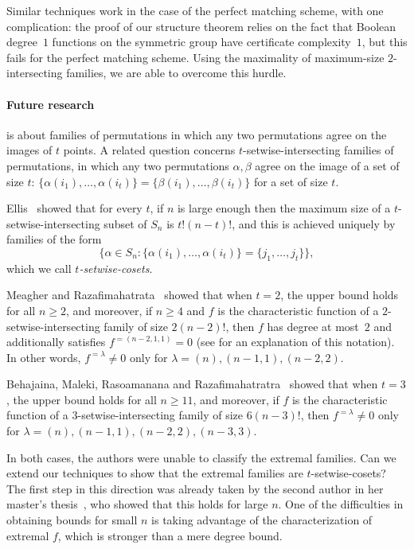 \documentclass{article}
\theoremstyle{definition}
\begin{document}
Similar techniques work in the case of the perfect matching scheme, with one complication: the proof of our structure theorem relies on the fact that Boolean degree~$1$ functions on the symmetric group have certificate complexity~$1$, but this fails for the perfect matching scheme. Using the maximality of maximum-size $2$-intersecting families, we are able to overcome this hurdle.

\paragraph{Future research}  is about families of permutations in which any two permutations agree on the images of $t$ points. A related question concerns $t$-setwise-intersecting families of permutations, in which any two permutations $\alpha,\beta$ agree on the image of a set of size $t$: $\{\alpha(i_1),\ldots,\alpha(i_t)\} = \{\beta(i_1),\ldots,\beta(i_t)\}$ for a set of size $t$. %

Ellis~\cite{EllisSetwise} showed that for every $t$, if $n$ is large enough then the maximum size of a $t$-setwise-intersecting subset of $S_n$ is $t! (n-t)!$, and this is achieved uniquely by families of the form
\[
 \bigl\{\alpha \in S_n : \{\alpha(i_1),\ldots,\alpha(i_t)\} = \{j_1,\ldots,j_t\}\bigr\},
\]
which we call \emph{$t$-setwise-cosets}.

Meagher and Razafimahatrata~\cite{MR21} showed that when $t = 2$, the upper bound holds for all $n \geq 2$, and moreover, if $n \geq 4$ and $f$ is the characteristic function of a $2$-setwise-intersecting family of size $2(n-2)!$, then $f$ has degree at most~$2$ and additionally satisfies $f^{=(n-2,1,1)} = 0$ (see  for an explanation of this notation). In other words, $f^{=\lambda} \neq 0$ only for $\lambda = (n), (n-1,1), (n-2,2)$.

Behajaina, Maleki, Rasoamanana and Razafimahatratra~\cite{BMRR} showed that when $t = 3$, the upper bound holds for all $n \geq 11$, and moreover, if $f$ is the characteristic function of a $3$-setwise-intersecting family of size $6(n-3)!$, then $f^{=\lambda} \neq 0$ only for $\lambda = (n),(n-1,1),(n-2,2),(n-3,3)$.

In both cases, the authors were unable to classify the extremal families. Can we extend our techniques to show that the extremal families are $t$-setwise-cosets? The first step in this direction was already taken by the second author in her master's thesis~\cite{DafniThesis}, who showed that this holds for large $n$. One of the difficulties in obtaining bounds for small $n$ is taking advantage of the characterization of extremal $f$, which is stronger than a mere degree bound.
\end{document}
